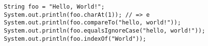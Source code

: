 \documentclass[
  11pt, %
  xcolor=dvipsnames
]{beamer}
\begin{document}
\begin{frame}[fragile]

	\begin{columns}
		\begin{column}{0.9\textwidth}

			\begin{lstlisting}[style=Java]
String foo = "Hello, World!";
System.out.println(foo.charAt(1)); // => e
System.out.println(foo.compareTo("hello, world!"));
System.out.println(foo.equalsIgnoreCase("hello, world!"));
System.out.println(foo.indexOf("World"));
      \end{lstlisting}

		\end{column}
	\end{columns}
\end{frame}
\end{document}
